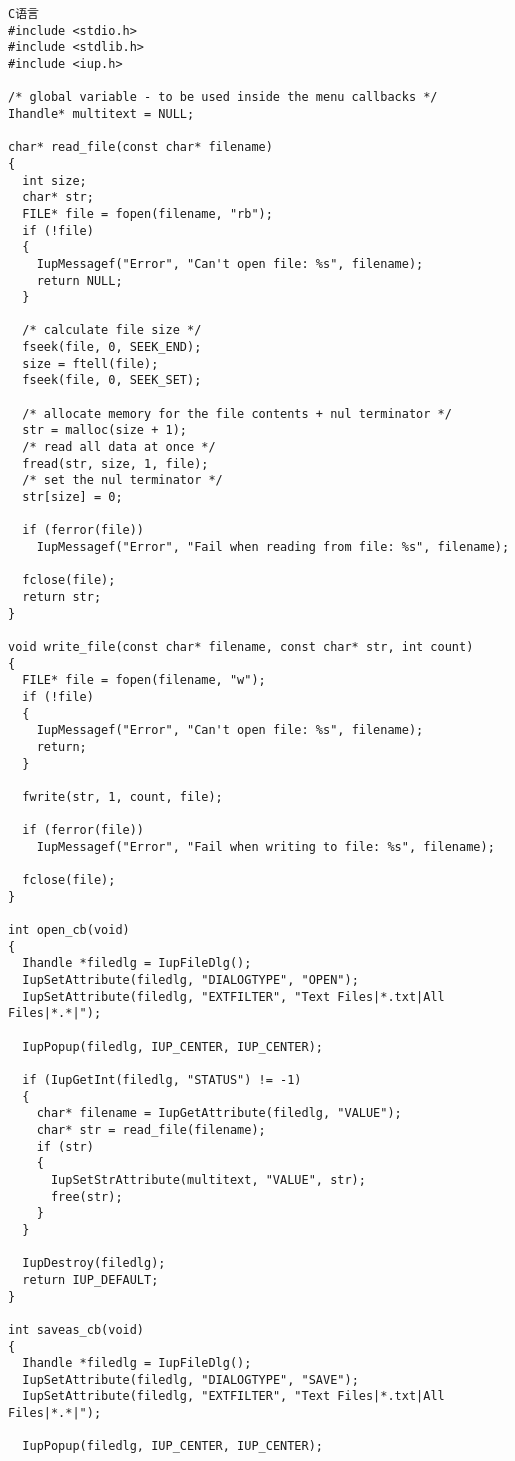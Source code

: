 \documentclass{ctexart}
\begin{document}
\lstset{language=C}
\begin{lstlisting}
C语言
#include <stdio.h>
#include <stdlib.h>
#include <iup.h>

/* global variable - to be used inside the menu callbacks */
Ihandle* multitext = NULL;

char* read_file(const char* filename)
{
  int size;
  char* str;
  FILE* file = fopen(filename, "rb");
  if (!file) 
  {
    IupMessagef("Error", "Can't open file: %s", filename);
    return NULL;
  }

  /* calculate file size */
  fseek(file, 0, SEEK_END);
  size = ftell(file);
  fseek(file, 0, SEEK_SET);

  /* allocate memory for the file contents + nul terminator */
  str = malloc(size + 1);
  /* read all data at once */
  fread(str, size, 1, file);
  /* set the nul terminator */
  str[size] = 0;

  if (ferror(file))
    IupMessagef("Error", "Fail when reading from file: %s", filename);

  fclose(file);
  return str;
}

void write_file(const char* filename, const char* str, int count)
{
  FILE* file = fopen(filename, "w");
  if (!file) 
  {
    IupMessagef("Error", "Can't open file: %s", filename);
    return;
  }

  fwrite(str, 1, count, file);

  if (ferror(file))
    IupMessagef("Error", "Fail when writing to file: %s", filename);

  fclose(file);
}

int open_cb(void)
{
  Ihandle *filedlg = IupFileDlg();
  IupSetAttribute(filedlg, "DIALOGTYPE", "OPEN");
  IupSetAttribute(filedlg, "EXTFILTER", "Text Files|*.txt|All Files|*.*|");

  IupPopup(filedlg, IUP_CENTER, IUP_CENTER);

  if (IupGetInt(filedlg, "STATUS") != -1)
  {
    char* filename = IupGetAttribute(filedlg, "VALUE");
    char* str = read_file(filename);
    if (str)
    {
      IupSetStrAttribute(multitext, "VALUE", str);
      free(str);
    }
  }

  IupDestroy(filedlg);
  return IUP_DEFAULT;
}

int saveas_cb(void)
{
  Ihandle *filedlg = IupFileDlg();
  IupSetAttribute(filedlg, "DIALOGTYPE", "SAVE");
  IupSetAttribute(filedlg, "EXTFILTER", "Text Files|*.txt|All Files|*.*|");

  IupPopup(filedlg, IUP_CENTER, IUP_CENTER);


\end{lstlisting}
\end{document}
